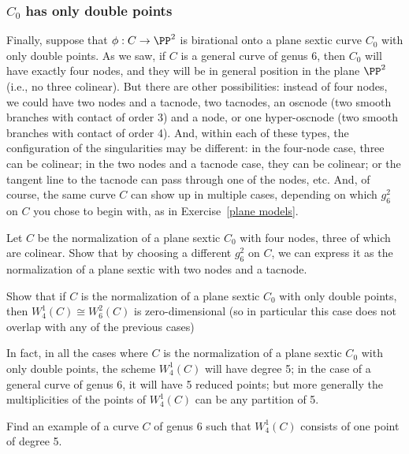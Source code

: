 \subsubsection{$C_0$ has only double points}
Finally, suppose that $\phi : C \to \PP^2$ is birational onto a plane sextic curve $C_0$ with only double points. As we saw, if $C$ is a general curve of genus 6, then $C_0$ will have exactly four nodes, and they will be in general position in the plane $\PP^2$ (i.e., no three colinear). But there are other possibilities: instead of four nodes, we could have two nodes and a tacnode, two tacnodes, an oscnode (two smooth branches with contact of order 3) and a node, or one hyper-oscnode (two smooth branches with contact of order 4). And, within each of these types, the configuration of the singularities may be different: in the four-node case, three can be colinear; in the two nodes and a tacnode case, they can be colinear; or the tangent line to the tacnode can pass through one of the nodes, etc. And, of course, the same curve $C$ can show up in multiple cases, depending on which $g^2_6$ on $C$ you chose to begin with, as in Exercise~\ref{plane models}. 

\begin{exercise}\label{plane models}
Let $C$ be the normalization of a plane sextic $C_0$ with four nodes, three of which are colinear. Show that by choosing a different $g^2_6$ on $C$, we can express it as the normalization of a plane sextic with two nodes and a tacnode.
\end{exercise}


\begin{exercise}
Show that if $C$ is the normalization of a plane sextic $C_0$ with only double points, then $W^1_4(C) \cong W^2_6(C)$ is zero-dimensional (so in particular this case does not overlap with any of the previous cases)
\end{exercise}

In fact, in all the cases where $C$ is the normalization of a plane sextic $C_0$ with only double points, the scheme $W^1_4(C)$ will have degree 5; in the  case of a general curve of genus 6, it will have 5 reduced points; but more generally the multiplicities of the points of $W^1_4(C)$ can be any partition of 5.


\begin{exercise}
Find an example of a curve $C$ of genus 6 such that $W^1_4(C)$ consists of one point of degree 5.
\end{exercise}

